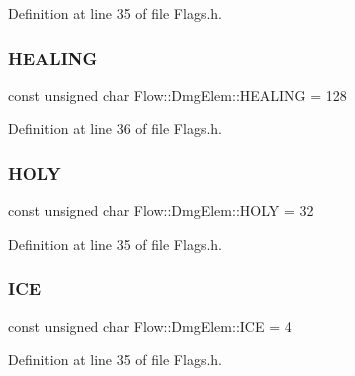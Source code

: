 Definition at line 35 of file Flags.\+h.

\hypertarget{namespace_flow_1_1_dmg_elem_af91abc6a76da493ae0aab97998f10a3c}{}\label{namespace_flow_1_1_dmg_elem_af91abc6a76da493ae0aab97998f10a3c} 
\subsubsection{\texorpdfstring{H\+E\+A\+L\+I\+NG}{HEALING}}
{\footnotesize\ttfamily const unsigned char Flow\+::\+Dmg\+Elem\+::\+H\+E\+A\+L\+I\+NG = 128}



Definition at line 36 of file Flags.\+h.

\hypertarget{namespace_flow_1_1_dmg_elem_a9cf12825628ffbf718079827d6706619}{}\label{namespace_flow_1_1_dmg_elem_a9cf12825628ffbf718079827d6706619} 
\subsubsection{\texorpdfstring{H\+O\+LY}{HOLY}}
{\footnotesize\ttfamily const unsigned char Flow\+::\+Dmg\+Elem\+::\+H\+O\+LY = 32}



Definition at line 35 of file Flags.\+h.

\hypertarget{namespace_flow_1_1_dmg_elem_a30739bfaff89a78947afa83acd27fc16}{}\label{namespace_flow_1_1_dmg_elem_a30739bfaff89a78947afa83acd27fc16} 
\subsubsection{\texorpdfstring{I\+CE}{ICE}}
{\footnotesize\ttfamily const unsigned char Flow\+::\+Dmg\+Elem\+::\+I\+CE = 4}



Definition at line 35 of file Flags.\+h.

\hypertarget{namespace_flow_1_1_dmg_elem_ae77f57817a01c597933d72de6f00df36}{}\label{namespace_flow_1_1_dmg_elem_ae77f57817a01c597933d72de6f00df36} 
